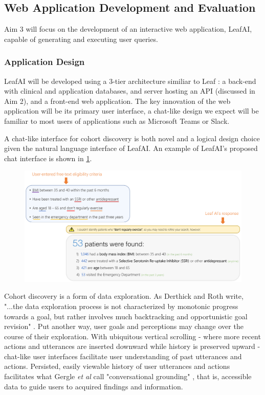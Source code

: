 \documentclass[../main.tex]{subfiles}
\begin{document}
\subsection{Web Application Development and Evaluation}

Aim 3 will focus on the development of an interactive web application, LeafAI, capable of generating and executing user queries. 

\subsubsection{Application Design}

LeafAI will be developed using a 3-tier architecture similiar to Leaf \cite{dobbins2019leaf}: a back-end with clinical and application databases, and server hosting an API (discussed in Aim 2), and a front-end web application. The key innovation of the web application will be its primary user interface, a chat-like design we expect will be familiar to most users of applications such as Microsoft Teams or Slack.

A chat-like interface for cohort discovery is both novel and a logical design choice given the natural language interface of LeafAI. An example of LeafAI's proposed chat interface is shown in \ref{aim3_fig_demo}. 

\begin{figure}[h!]
  \includegraphics[scale=0.58]{Figures/Aim3/aim3_demo.pdf}  
  \caption{}
\label{aim3_fig_demo}
\end{figure}

Cohort discovery is a form of data exploration. As Derthick and Roth write, "...the data exploration process is not characterized by monotonic progress towards a goal, but rather involves much backtracking and opportunistic goal revision" \cite{derthick2001enhancing}. Put another way, user goals and perceptions may change over the course of their exploration. With ubiquitous vertical scrolling - where more recent actions and utterances are inserted downward while history is preserved upward - chat-like user interfaces facilitate user understanding of past utterances and actions. Persisted, easily viewable history of user utterances and actions facilitates what Gergle \textit{et al} call "conversational grounding" \cite{gergle2004persistence}, that is, accessible data to guide users to acquired findings and information.
\end{document}
